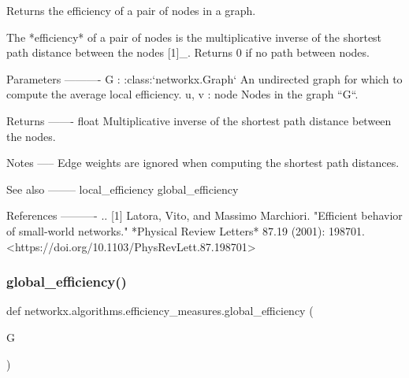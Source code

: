 \begin{DoxyVerb}Returns the efficiency of a pair of nodes in a graph.

The *efficiency* of a pair of nodes is the multiplicative inverse of the
shortest path distance between the nodes [1]_. Returns 0 if no path
between nodes.

Parameters
----------
G : :class:`networkx.Graph`
    An undirected graph for which to compute the average local efficiency.
u, v : node
    Nodes in the graph ``G``.

Returns
-------
float
    Multiplicative inverse of the shortest path distance between the nodes.

Notes
-----
Edge weights are ignored when computing the shortest path distances.

See also
--------
local_efficiency
global_efficiency

References
----------
.. [1] Latora, Vito, and Massimo Marchiori.
       "Efficient behavior of small-world networks."
       *Physical Review Letters* 87.19 (2001): 198701.
       <https://doi.org/10.1103/PhysRevLett.87.198701>\end{DoxyVerb}
 \mbox{\label{namespacenetworkx_1_1algorithms_1_1efficiency__measures_a25868f63960e002d393a52de5ed6dc5a}} 
\subsubsection{\texorpdfstring{global\+\_\+efficiency()}{global\_efficiency()}}
{\footnotesize\ttfamily def networkx.\+algorithms.\+efficiency\+\_\+measures.\+global\+\_\+efficiency (\begin{DoxyParamCaption}\item[{}]{G }\end{DoxyParamCaption})}

